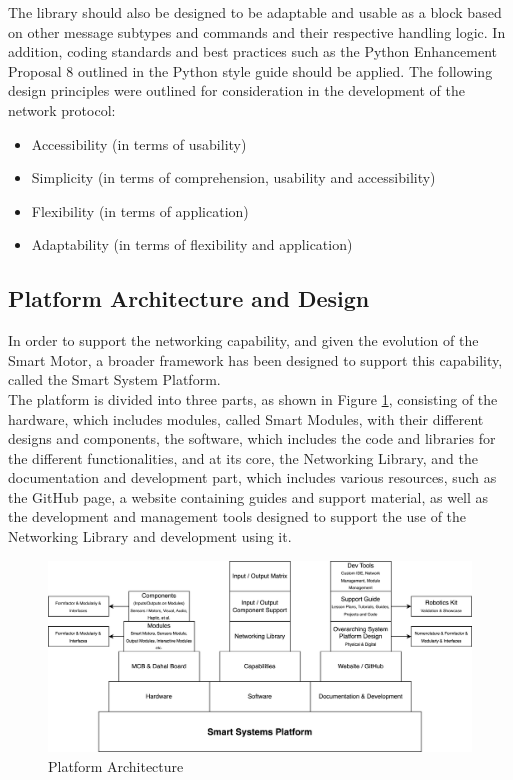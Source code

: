 The library should also be designed to be adaptable and usable as a block based on other message subtypes and commands and their respective handling logic.
In addition, coding standards and best practices such as the Python Enhancement Proposal 8 outlined in the Python style guide \citep{rossum_python_2001} should be applied. The following design principles were outlined for consideration in the development of the network protocol:
\begin{itemize}
    \item Accessibility (in terms of usability)
    \item Simplicity (in terms of comprehension, usability and accessibility)
    \item Flexibility (in terms of application)
    \item Adaptability (in terms of flexibility and application)
\end{itemize}

\subsection{\label{sec:methods_ssp_des}Platform Architecture and Design}

In order to support the networking capability, and given the evolution of the Smart Motor, a broader framework has been designed to support this capability, called the Smart System Platform. \\

The platform is divided into three parts, as shown in Figure \ref{fig:met:ssp_architecture}, consisting of the hardware, which includes modules, called Smart Modules, with their different designs and components, the software, which includes the code and libraries for the different functionalities, and at its core, the Networking Library, and the documentation and development part, which includes various resources, such as the GitHub page, a website containing guides and support material, as well as the development and management tools designed to support the use of the Networking Library and development using it.

\begin{figure}[H]
    \centering
    \includegraphics[width=\linewidth]{overleaf/images/Smart Systems Platform.drawio.png}
    \vspace{\ftspace}
    \caption{Platform Architecture}
    \label{fig:met:ssp_architecture}
\end{figure}

